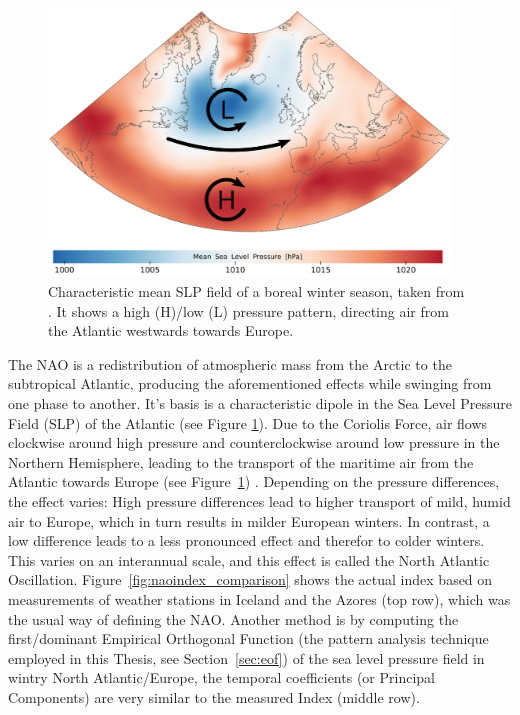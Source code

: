\begin{figure}[htb]
  \begin{center}
    \includegraphics[width=0.95\textwidth]{figures/nao_pattern_diss.png}
  \end{center}
  \caption{Characteristic mean SLP field of a boreal winter season, taken from \cite{vietinghoffdiss}. It shows a high (H)/low (L) pressure pattern, directing air from the Atlantic westwards towards Europe. }
  \label{fig:naopattern}
\end{figure}


The NAO is a redistribution of atmospheric mass from the Arctic to the subtropical Atlantic, producing the aforementioned effects while swinging from one phase to another. 
It's basis is a characteristic dipole in the Sea Level Pressure Field (SLP) of the Atlantic (see Figure \ref{fig:naopattern}).
Due to the Coriolis Force, air flows clockwise around high pressure and counterclockwise around low pressure in the Northern Hemisphere, leading to the transport of the maritime air from the Atlantic towards Europe (see Figure~\ref{fig:naopattern}) \cite{hurrell_overview_2003, vietinghoffdiss}. 
Depending on the pressure differences, the effect varies: High pressure differences lead to higher transport of mild, humid air to Europe, which in turn results in milder European winters. In contrast, a low difference leads to a less pronounced effect and therefor to colder winters. 
This varies on an interannual scale, and this effect is called the North Atlantic Oscillation. 
Figure~\ref{fig:naoindex_comparison} shows the actual index based on measurements of weather stations in Iceland and the Azores (top row), which was the usual way of defining the NAO. 
Another method is by computing the first/dominant Empirical Orthogonal Function (the pattern analysis technique employed in this Thesis, see Section~\ref{sec:eof}) of the sea level pressure field in wintry North Atlantic/Europe, the temporal coefficients (or Principal Components) are very similar to the measured Index (middle row). 

